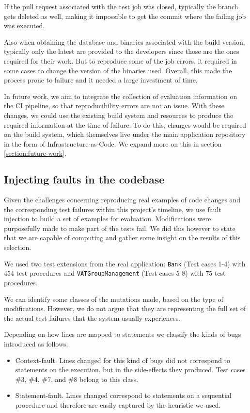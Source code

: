 \documentclass{article}
\begin{document}
If the pull request associated with the test job was closed, typically the branch gets deleted as well, making it impossible to get the commit where the failing job was executed.

Also when obtaining the database and binaries associated with the build version, typically only the latest are provided to the developers since those are the ones required for their work. But to reproduce some of the job errors, it required in some cases to change the version of the binaries used. Overall, this made the process prone to failure and it needed a large investment of time.

In future work, we aim to integrate the collection of evaluation information on the CI pipeline, so that reproducibility errors are not an issue. With these changes, we could use the existing build system and resources to produce the required information at the time of failure. To do this, changes would be required on the build system, which themselves live under the main application repository in the form of Infrastructure-as-Code. We expand more on this in section \ref{section:future-work}.

\subsection{Injecting faults in the codebase}
Given the challenges concerning reproducing real examples of code changes and the corresponding test failures within this project's timeline, we use fault injection to build a set of examples for evaluation. Modifications were purposefully made to make part of the tests fail. We did this however to state that we are capable of computing and gather some insight on the results of this selection.

We used two test extensions from the real application: \texttt{Bank} (Test cases 1-4) with 454 test procedures and \texttt{VATGroupManagement} (Test cases 5-8) with 75 test procedures. 

We can identify some classes of the mutations made, based on the type of modifications. However, we do not argue that they are representing the full set of the actual test failures that the system usually experiences. 

Depending on how lines are mapped to statements we classify the kinds of bugs introduced as follows:

\begin{itemize}
\item Context-fault. Lines changed for this kind of bugs did not correspond to statements on the execution, but in the side-effects they produced. Test cases \#3, \#4, \#7, and \#8 belong to this class.
\item Statement-fault. Lines changed correspond to statements on a sequential procedure and therefore are easily captured by the heuristic we used. 
\end{itemize}
\end{document}
